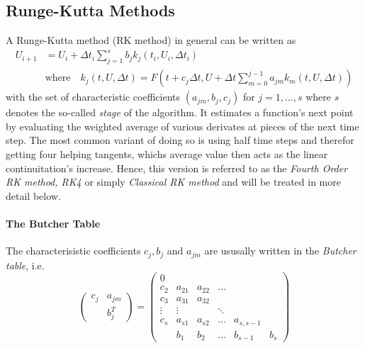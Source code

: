 \subsection{Runge-Kutta Methods}

A Runge-Kutta method (RK method) in general can be written as
\begin{align}
U_{i+1} &= U_i + \Delta t_i \sum_{j=1}^s b_j k_j(t_i, U_i, \Delta t_i) \\
&\text{where} \quad k_j(t, U, \Delta t) = F(t+c_j\Delta t, U+ \Delta t\sum_{m=0}^{j-1} a_{jm} k_m(t,U,\Delta t))
\end{align}
with the set of characteristic coefficients $(a_{jm}, b_j, c_j)$ for $j = 1,...,s$ where $s$ denotes the so-called \emph{stage} of the algorithm.
It estimates a function's next point by evaluating the weighted average of various derivates at pieces of the next time step.
The most common variant of doing so is using half time steps and therefor getting four helping tangents, whichs average value then acts as the linear continuitation's increase. Hence, this version is referred to as the \emph{Fourth Order RK method, RK4} or simply \emph{Classical RK method} and will be treated in more detail below.

\paragraph{The Butcher Table}
The characterisistic coefficients $c_j, b_j$ and $a_{jm}$ are ususally written in the \emph{Butcher table}, i.e.
\begin{equation}
  \begin{pmatrix}
    c_j & a_{jm} \\
    & b_j^T
  \end{pmatrix}
  =
  \begin{pmatrix}
    0 &&&&\\
    c_2 & a_{21} & a_{22} & \dots & \\
    c_3 & a_{31} & a_{32} && \\
    \vdots & \vdots & &\ddots &\\
    c_s & a_{s1} & a_{s2} & \dots & a_{s, s-1} \\
    & b_1 & b_2 & \dots & b_{s-1} & b_s
  \end{pmatrix}
\end{equation}





